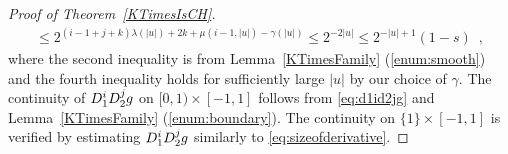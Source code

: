 \begin{proof}[Proof of Theorem~\ref{KTimesIsCH}]
\begin{align}
  \le 2^{(i-1+j+k)\lambda(|u|) + 2k + \mu(i-1, |u|)  - \gamma(|u|)}
  \le 2^{-2 \lvert u \rvert}
  \le 2^{-\lvert u \rvert + 1} (1 - s) \enspace , 
  \label{eq:sizeofderivative}
 \end{align}
where the second inequality is from 
Lemma~\ref{KTimesFamily} (\ref{enum:smooth})
and the fourth inequality holds for sufficiently large $\lvert u \rvert$
by our choice of $\gamma$. 
The continuity of $D _1 ^i D _2 ^j g$ on $[0,1) \times [-1, 1]$ follows
from \eqref{eq:d1id2jg} and Lemma~\ref{KTimesFamily} (\ref{enum:boundary}).
The continuity on $\{1\} \times [-1, 1]$ is verified by 
estimating $D_1^{i} D_2^{j} g$ similarly to \eqref{eq:sizeofderivative}. 
\end{proof} 

